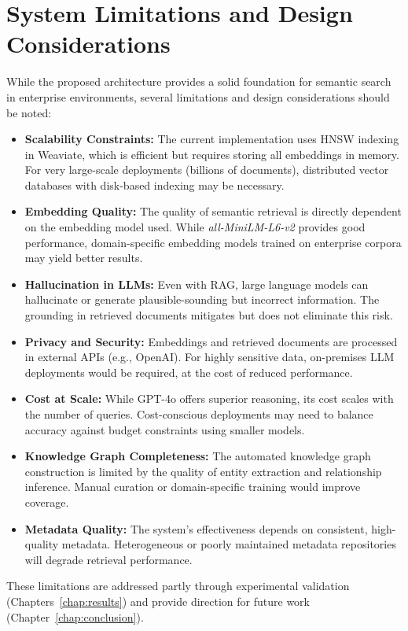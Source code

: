 \section{System Limitations and Design Considerations}\label{sec:system-limitations}

While the proposed architecture provides a solid foundation for semantic search in enterprise environments, several limitations and design considerations should be noted:

\begin{itemize}
    \item \textbf{Scalability Constraints:} The current implementation uses HNSW indexing in Weaviate, which is efficient but requires storing all embeddings in memory. For very large-scale deployments (billions of documents), distributed vector databases with disk-based indexing may be necessary.
    
    \item \textbf{Embedding Quality:} The quality of semantic retrieval is directly dependent on the embedding model used. While \textit{all-MiniLM-L6-v2} provides good performance, domain-specific embedding models trained on enterprise corpora may yield better results.
    
    \item \textbf{Hallucination in LLMs:} Even with \gls{RAG}, large language models can hallucinate or generate plausible-sounding but incorrect information. The grounding in retrieved documents mitigates but does not eliminate this risk.
    
    \item \textbf{Privacy and Security:} Embeddings and retrieved documents are processed in external APIs (e.g., OpenAI). For highly sensitive data, on-premises \gls{LLM} deployments would be required, at the cost of reduced performance.
    
    \item \textbf{Cost at Scale:} While \gls{GPT}-4o offers superior reasoning, its cost scales with the number of queries. Cost-conscious deployments may need to balance accuracy against budget constraints using smaller models.
    
    \item \textbf{Knowledge Graph Completeness:} The automated knowledge graph construction is limited by the quality of entity extraction and relationship inference. Manual curation or domain-specific training would improve coverage.
    
    \item \textbf{Metadata Quality:} The system's effectiveness depends on consistent, high-quality metadata. Heterogeneous or poorly maintained metadata repositories will degrade retrieval performance.
    
\end{itemize}

These limitations are addressed partly through experimental validation (Chapters~\ref{chap:results}) and provide direction for future work (Chapter~\ref{chap:conclusion}).





